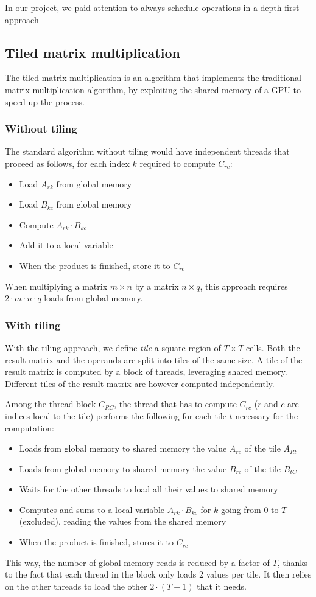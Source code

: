 In our project, we paid attention to always schedule operations in a depth-first approach

\subsection{Tiled matrix multiplication}

The tiled matrix multiplication is an algorithm that implements the traditional matrix multiplication algorithm, by exploiting the shared memory of a GPU to speed up the process.

\subsubsection{Without tiling}

The standard algorithm without tiling would have independent threads that proceed as follows, for each index $k$ required to compute $C_{rc}$:
\begin{itemize}
	\itemsep 0em
	\item Load $A_{rk}$ from global memory
	\item Load $B_{kc}$ from global memory
	\item Compute $A_{rk} \cdot B_{kc}$
	\item Add it to a local variable
	\item When the product is finished, store it to $C_{rc}$
\end{itemize}

When multiplying a matrix $m \times n$ by a matrix $n \times q$, this approach requires $2 \cdot m \cdot n \cdot q$ loads from global memory.

\subsubsection{With tiling}

With the tiling approach, we define \textit{tile} a square region of $T \times T$ cells.
Both the result matrix and the operands are split into tiles of the same size.
A tile of the result matrix is computed by a block of threads, leveraging shared memory.
Different tiles of the result matrix are however computed independently.

Among the thread block $C_{RC}$, the thread that has to compute $C_{rc}$ ($r$ and $c$ are indices local to the tile) performs the following for each tile $t$ necessary for the computation:
\begin{itemize}
	\itemsep 0em
	\item Loads from global memory to shared memory the value $A_{rc}$ of the tile $A_{Rt}$
	\item Loads from global memory to shared memory the value $B_{rc}$ of the tile $B_{tC}$
	\item Waits for the other threads to load all their values to shared memory
	\item Computes and sums to a local variable $A_{rk} \cdot B_{kc}$ for $k$ going from $0$ to $T$ (excluded), reading the values from the shared memory
	\item When the product is finished, stores it to $C_{rc}$
\end{itemize}

This way, the number of global memory reads is reduced by a factor of $T$, thanks to the fact that each thread in the block only loads $2$ values per tile.
It then relies on the other threads to load the other $2\cdot(T-1)$ that it needs.
